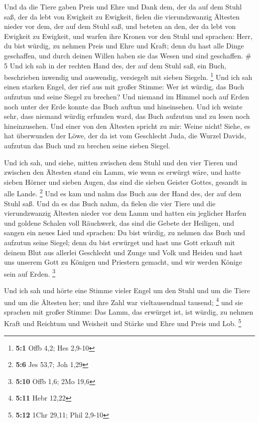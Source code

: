  Und da die Tiere gaben Preis und Ehre und Dank dem, der da
auf dem Stuhl saß, der da lebt von Ewigkeit zu Ewigkeit, 
fielen die vierundzwanzig Ältesten nieder vor dem, der auf dem Stuhl
saß, und beteten an den, der da lebt von Ewigkeit zu Ewigkeit, und
warfen ihre Kronen vor den Stuhl und sprachen:  Herr, du
bist würdig, zu nehmen Preis und Ehre und Kraft; denn du hast alle Dinge
geschaffen, und durch deinen Willen haben sie das Wesen und sind
geschaffen. \# 5  Und ich sah in der rechten Hand des, der
auf dem Stuhl saß, ein Buch, beschrieben inwendig und auswendig,
versiegelt mit sieben Siegeln. \footnote{\textbf{5:1} Offb 4,2; Hes
  2,9-10}  Und ich sah einen starken Engel, der rief aus mit
großer Stimme: Wer ist würdig, das Buch aufzutun und seine Siegel zu
brechen?  Und niemand im Himmel noch auf Erden noch unter
der Erde konnte das Buch auftun und hineinsehen.  Und ich
weinte sehr, dass niemand würdig erfunden ward, das Buch aufzutun und zu
lesen noch hineinzusehen.  Und einer von den Ältesten
spricht zu mir: Weine nicht! Siehe, es hat überwunden der Löwe, der da
ist vom Geschlecht Juda, die Wurzel Davids, aufzutun das Buch und zu
brechen seine sieben Siegel.

 Und ich sah, und siehe, mitten zwischen dem Stuhl und den
vier Tieren und zwischen den Ältesten stand ein Lamm, wie wenn es
erwürgt wäre, und hatte sieben Hörner und sieben Augen, das sind die
sieben Geister Gottes, gesandt in alle Lande. \footnote{\textbf{5:6} Jes
  53,7; Joh 1,29}  Und es kam und nahm das Buch aus der Hand
des, der auf dem Stuhl saß.  Und da es das Buch nahm, da
fielen die vier Tiere und die vierundzwanzig Ältesten nieder vor dem
Lamm und hatten ein jeglicher Harfen und goldene Schalen voll Räuchwerk,
das sind die Gebete der Heiligen,  und sangen ein neues Lied
und sprachen: Du bist würdig, zu nehmen das Buch und aufzutun seine
Siegel; denn du bist erwürget und hast uns Gott erkauft mit deinem Blut
aus allerlei Geschlecht und Zunge und Volk und Heiden  und
hast uns unserem Gott zu Königen und Priestern gemacht, und wir werden
Könige sein auf Erden. \footnote{\textbf{5:10} Offb 1,6; 2Mo 19,6}

 Und ich sah und hörte eine Stimme vieler Engel um den
Stuhl und um die Tiere und um die Ältesten her; und ihre Zahl war
vieltausendmal tausend; \footnote{\textbf{5:11} Hebr 12,22}
 und sie sprachen mit großer Stimme: Das Lamm, das erwürget
ist, ist würdig, zu nehmen Kraft und Reichtum und Weisheit und Stärke
und Ehre und Preis und Lob. \footnote{\textbf{5:12} 1Chr 29,11; Phil
  2,9-10}

